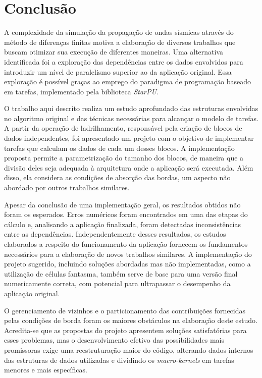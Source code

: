 \documentclass[cic,tc]{iiufrgs}
\begin{document}
\chapter{Conclusão}\label{sec:conclusion}

A complexidade da simulação da propagação de ondas sísmicas através do método de diferenças finitas motiva a elaboração de diversos trabalhos que buscam otimizar sua execução de diferentes
maneiras. Uma alternativa identificada foi a exploração das dependências entre os dados envolvidos para introduzir um nível de paralelismo superior ao da aplicação original.
Essa exploração é possível graças ao emprego do paradigma de programação baseado em tarefas, implementado pela biblioteca \textit{StarPU}.

O trabalho aqui descrito realiza um estudo aprofundado das estruturas envolvidas no algoritmo original e das técnicas necessárias para alcançar o modelo de tarefas. A partir da operação
de ladrilhamento, responsável pela criação de blocos de dados independentes, foi apresentado um projeto com o objetivo de implementar tarefas que calculam os dados de cada um desses blocos.
A implementação proposta permite a parametrização do tamanho dos blocos, de maneira que a divisão deles seja adequada à arquitetura onde a aplicação será executada. Além disso, ela considera
as condições de absorção das bordas, um aspecto não abordado por outros trabalhos similares.

Apesar da conclusão de uma implementação geral, os resultados obtidos não foram os esperados. Erros numéricos foram encontrados em uma das etapas do cálculo e, analisando a aplicação finalizada,
foram detectadas inconsistências entre as dependências. Independentemente desses resultados, os estudos elaborados a respeito do funcionamento da aplicação fornecem os fundamentos necessários para a elaboração de
novos trabalhos similares. A implementação do projeto sugerido, incluindo soluções abordadas mas não implementadas, como a utilização de células fantasma, também serve de base para uma versão final numericamente correta, com potencial para ultrapassar o desempenho da aplicação original.

O gerenciamento de vizinhos e o particionamento das contribuições fornecidas pelas condições de borda foram os maiores obstáculos na elaboração deste estudo. Acredita-se que as propostas
do projeto apresentem soluções satisfatórias para esses problemas, mas o desenvolvimento efetivo das possibilidades mais promissoras exige uma reestruturação maior do código, alterando dados
internos das estruturas de dados utilizadas e dividindo os \textit{macro-kernels} em tarefas menores e mais específicas.
\end{document}
